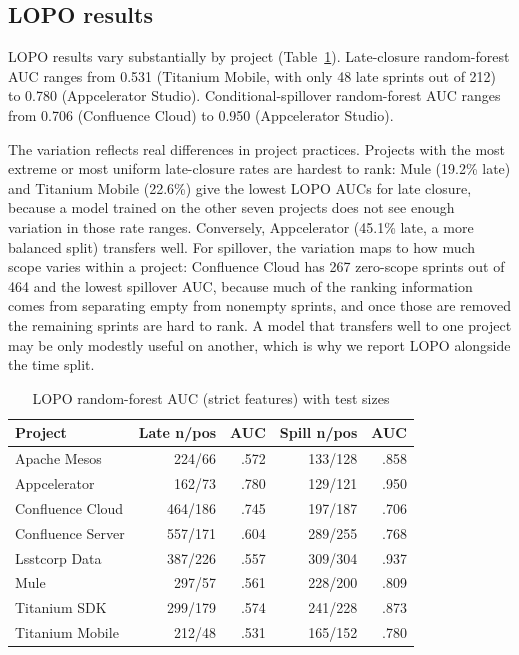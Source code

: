 \documentclass[conference]{IEEEtran}
\begin{document}
\subsection{LOPO results}
\label{sec:lopo}

LOPO results vary substantially by project (Table~\ref{tab:lopo}).
Late-closure random-forest AUC ranges from 0.531 (Titanium Mobile, with only 48 late sprints out of 212) to 0.780 (Appcelerator Studio).
Conditional-spillover random-forest AUC ranges from 0.706 (Confluence Cloud) to 0.950 (Appcelerator Studio).

The variation reflects real differences in project practices.
Projects with the most extreme or most uniform late-closure rates are hardest to rank: Mule (19.2\% late) and Titanium Mobile (22.6\%) give the lowest LOPO AUCs for late closure, because a model trained on the other seven projects does not see enough variation in those rate ranges.
Conversely, Appcelerator (45.1\% late, a more balanced split) transfers well.
For spillover, the variation maps to how much scope varies within a project: Confluence Cloud has 267 zero-scope sprints out of 464 and the lowest spillover AUC, because much of the ranking information comes from separating empty from nonempty sprints, and once those are removed the remaining sprints are hard to rank.
A model that transfers well to one project may be only modestly useful on another, which is why we report LOPO alongside the time split.

\begin{table}[!htb]
\centering\scriptsize
\caption{LOPO random-forest AUC (strict features) with test sizes}
\label{tab:lopo}
\setlength{\tabcolsep}{2.0pt}
\begin{tabular}{@{}p{1.95cm}rrrr@{}}
\toprule
Project & Late n/pos & AUC & Spill n/pos & AUC\\
\midrule
Apache Mesos & 224/66 & .572 & 133/128 & .858\\
Appcelerator & 162/73 & .780 & 129/121 & .950\\
Confluence Cloud & 464/186 & .745 & 197/187 & .706\\
Confluence Server & 557/171 & .604 & 289/255 & .768\\
Lsstcorp Data & 387/226 & .557 & 309/304 & .937\\
Mule & 297/57 & .561 & 228/200 & .809\\
Titanium SDK & 299/179 & .574 & 241/228 & .873\\
Titanium Mobile & 212/48 & .531 & 165/152 & .780\\
\bottomrule
\end{tabular}
\end{table}
\end{document}
